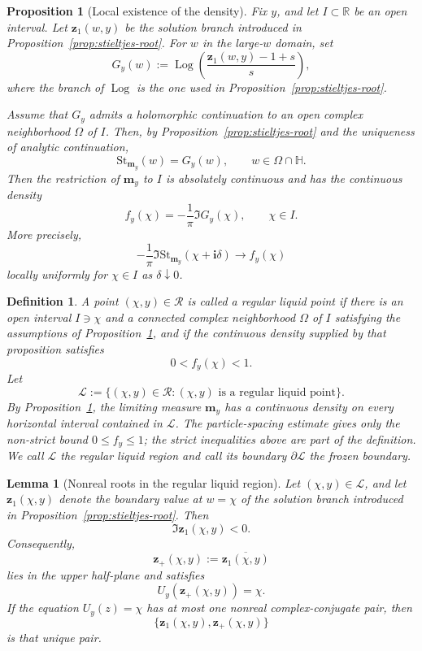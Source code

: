 \documentclass[10pt,a4paper]{amsart}
\newtheorem{proposition}{Proposition}
\newtheorem{definition}{Definition}
\newtheorem{lemma}{Lemma}
\begin{document}
\begin{proposition}[Local existence of the density]
\label{prop:density-existence}
Fix \(y\), and let \(I\subset\mathbb R\) be an open interval.
Let \(\mathbf z_1(w,y)\) be the solution branch introduced in
Proposition~\ref{prop:stieltjes-root}. For \(w\) in the large-\(w\)
domain, set
\[
    G_y(w)
    :=
    \operatorname{Log}\!\left(
        \frac{\mathbf z_1(w,y)-1+s}{s}
    \right),
\]
where the branch of \(\operatorname{Log}\) is the one used in
Proposition~\ref{prop:stieltjes-root}.

Assume that \(G_y\) admits a holomorphic continuation to an open
complex neighborhood \(\Omega\) of \(I\). Then, by
Proposition~\ref{prop:stieltjes-root} and the uniqueness of analytic
continuation,
\[
    \mathrm{St}_{\mathbf m_y}(w)=G_y(w),
    \qquad w\in\Omega\cap\mathbb H.
\]
Then the restriction of \(\mathbf m_y\) to \(I\) is absolutely
continuous and has the continuous density
\[
    f_y(\chi)
    =
    -\frac{1}{\pi}\Im G_y(\chi),
    \qquad \chi\in I.
\]
More precisely,
\[
    -\frac{1}{\pi}
    \Im\mathrm{St}_{\mathbf m_y}(\chi+\mathbf i\delta)
    \longrightarrow
    f_y(\chi)
\]
locally uniformly for \(\chi\in I\) as \(\delta\downarrow0\).
\end{proposition}

\begin{definition}\label{df28}
A point $(\chi,y)\in\mathcal R$ is called a \emph{regular liquid
point} if there is an open interval $I\ni\chi$ and a connected complex
neighborhood $\Omega$ of $I$ satisfying the assumptions of
Proposition~\ref{prop:density-existence}, and if the continuous density
supplied by that proposition satisfies
\[
    0<f_y(\chi)<1.
\]
Let
\[
    \mathcal L
    :=
    \{(\chi,y)\in\mathcal R:(\chi,y)\text{ is a regular liquid point}\}.
\]
By Proposition~\ref{prop:density-existence}, the limiting measure
$\mathbf m_y$ has a continuous density on every horizontal interval
contained in $\mathcal L$. The particle-spacing estimate gives only the
non-strict bound $0\leq f_y\leq1$; the strict inequalities above are part
of the definition. We call $\mathcal L$ the regular liquid region and
call its boundary $\partial\mathcal L$ the frozen boundary.

\end{definition}

\begin{lemma}[Nonreal roots in the regular liquid region]
\label{lem:liquid-nonreal-root}
Let \((\chi,y)\in\mathcal L\), and let
\(\mathbf z_1(\chi,y)\) denote the boundary value at \(w=\chi\) of the
solution branch introduced in
Proposition~\ref{prop:stieltjes-root}. Then
\[
    \Im \mathbf z_1(\chi,y)<0.
\]
Consequently,
\[
    \mathbf z_+(\chi,y)
    :=
    \overline{\mathbf z_1(\chi,y)}
\]
lies in the upper half-plane and satisfies
\[
    U_y(\mathbf z_+(\chi,y))=\chi.
\]
If the equation \(U_y(z)=\chi\) has at most one nonreal
complex-conjugate pair, then
\[
    \bigl\{
        \mathbf z_1(\chi,y),
        \mathbf z_+(\chi,y)
    \bigr\}
\]
is that unique pair.
\end{lemma}
\end{document}
